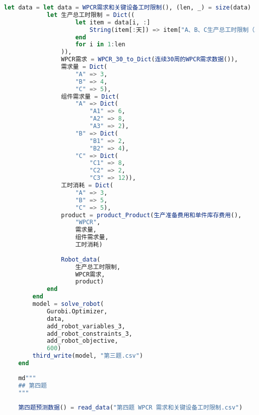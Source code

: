 \begin{appendices}
\begin{lstlisting}[language=julia]
    let data = let data = WPCR需求和关键设备工时限制(), (len, _) = size(data)
            let 生产总工时限制 = Dict((
                    let item = data[i, :]
                        String(item[:天]) => item["A、B、C生产总工时限制（工时）"]
                    end
                    for i in 1:len
                )),
                WPCR需求 = WPCR_30_to_Dict(连续30周的WPCR需求数据()),
                需求量 = Dict(
                    "A" => 3,
                    "B" => 4,
                    "C" => 5),
                组件需求量 = Dict(
                    "A" => Dict(
                        "A1" => 6,
                        "A2" => 8,
                        "A3" => 2),
                    "B" => Dict(
                        "B1" => 2,
                        "B2" => 4),
                    "C" => Dict(
                        "C1" => 8,
                        "C2" => 2,
                        "C3" => 12)),
                工时消耗 = Dict(
                    "A" => 3,
                    "B" => 5,
                    "C" => 5),
                product = product_Product(生产准备费用和单件库存费用(),
                    "WPCR",
                    需求量,
                    组件需求量,
                    工时消耗)
    
                Robot_data(
                    生产总工时限制,
                    WPCR需求,
                    product)
            end
        end
        model = solve_robot(
            Gurobi.Optimizer,
            data,
            add_robot_variables_3,
            add_robot_constraints_3,
            add_robot_objective,
            600)
        third_write(model, "第三题.csv")
    end
    
    md"""
    ## 第四题
    """
    
    第四题预测数据() = read_data("第四题 WPCR 需求和关键设备工时限制.csv")
    

\end{lstlisting}
\end{appendices}
